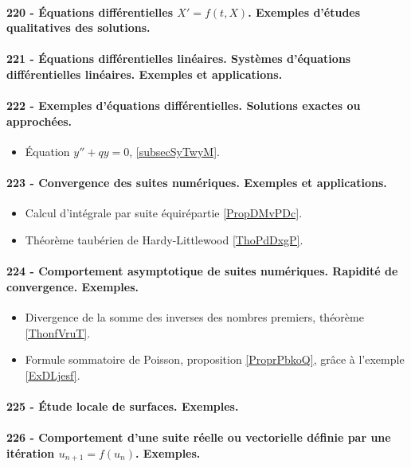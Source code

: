 \paragraph{220 - Équations différentielles $X' = f (t , X )$. Exemples d’études qualitatives des solutions.}
\paragraph{221 - Équations différentielles linéaires. Systèmes d’équations différentielles linéaires. Exemples et applications.}
\paragraph{222 - Exemples d’équations différentielles. Solutions exactes ou approchées.}
\begin{itemize}
    \item Équation \( y''+qy=0\), \ref{subsecSyTwyM}.
\end{itemize}
\paragraph{223 - Convergence des suites numériques. Exemples et applications.}
\begin{itemize}
    \item Calcul d'intégrale par suite équirépartie \ref{PropDMvPDc}.
    \item Théorème taubérien de Hardy-Littlewood \ref{ThoPdDxgP}.
\end{itemize}
\paragraph{224 - Comportement asymptotique de suites numériques. Rapidité de convergence. Exemples.}
\begin{itemize}
    \item Divergence de la somme des inverses des nombres premiers, théorème \ref{ThonfVruT}.
    \item Formule sommatoire de Poisson, proposition \ref{ProprPbkoQ}, grâce à l'exemple \ref{ExDLjesf}.
\end{itemize}
\paragraph{225 - Étude locale de surfaces. Exemples.}
\paragraph{226 - Comportement d’une suite réelle ou vectorielle définie par une itération \( u_{n+1}=f(u_n)\). Exemples.}

